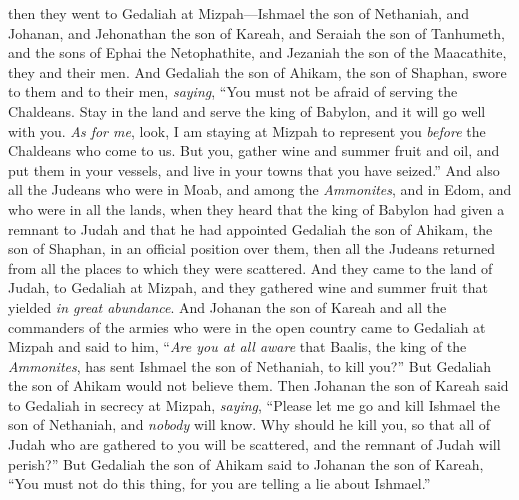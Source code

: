 \begin{biblechapter}
\verse then they went to Gedaliah at Mizpah—Ishmael the son of Nethaniah, and Johanan, and Jehonathan the son of Kareah, and Seraiah the son of Tanhumeth, and the sons of Ephai the Netophathite, and Jezaniah the son of the Maacathite, they and their men.
\verse And Gedaliah the son of Ahikam, the son of Shaphan, swore to them and to their men, \textit{saying}, “You must not be afraid of serving the Chaldeans. Stay in the land and serve the king of Babylon, and it will go well with you.
\verse \textit{As for me}, look, I am staying at Mizpah to represent you \textit{before} the Chaldeans who come to us. But you, gather wine and summer fruit and oil, and put them in your vessels, and live in your towns that you have seized.”
\verse And also all the Judeans who were in Moab, and among the \textit{Ammonites}, and in Edom, and who were in all the lands, when they heard that the king of Babylon had given a remnant to Judah and that he had appointed Gedaliah the son of Ahikam, the son of Shaphan, in an official position over them,
\verse then all the Judeans returned from all the places to which they were scattered. And they came to the land of Judah, to Gedaliah at Mizpah, and they gathered wine and summer fruit that yielded \textit{in great abundance}.
\verse And Johanan the son of Kareah and all the commanders of the armies who were in the open country came to Gedaliah at Mizpah
\verse and said to him, “\textit{Are you at all aware} that Baalis, the king of the \textit{Ammonites}, has sent Ishmael the son of Nethaniah, to kill you?” But Gedaliah the son of Ahikam would not believe them.
\verse Then Johanan the son of Kareah said to Gedaliah in secrecy at Mizpah, \textit{saying}, “Please let me go and kill Ishmael the son of Nethaniah, and \textit{nobody} will know. Why should he kill you, so that all of Judah who are gathered to you will be scattered, and the remnant of Judah will perish?”
\verse But Gedaliah the son of Ahikam said to Johanan the son of Kareah, “You must not do this thing, for you are telling a lie about Ishmael.”
\end{biblechapter}

